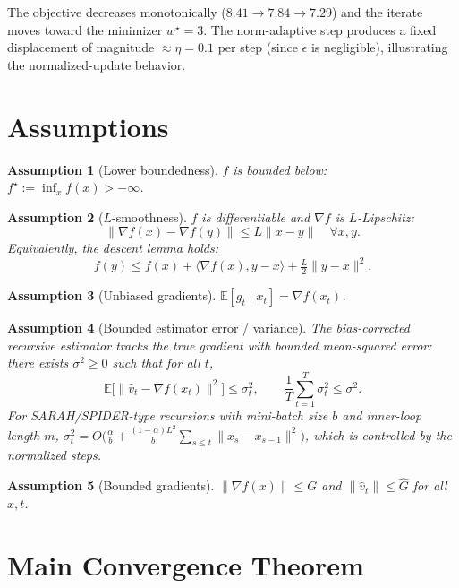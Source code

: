 \documentclass[11pt]{article}
\newtheorem{assumption}{Assumption}
\begin{document}
\noindent
The objective decreases monotonically ($8.41 \to 7.84 \to 7.29$) and the iterate moves
toward the minimizer $w^\star=3$. The norm-adaptive step produces a fixed displacement of
magnitude $\approx \eta = 0.1$ per step (since $\epsilon$ is negligible), illustrating the
normalized-update behavior.

\section*{Assumptions}

\begin{assumption}[Lower boundedness]\label{as:lb}
$f$ is bounded below: $f^\star := \inf_x f(x) > -\infty$.
\end{assumption}

\begin{assumption}[$L$-smoothness]\label{as:smooth}
$f$ is differentiable and $\nabla f$ is $L$-Lipschitz:
\[
\|\nabla f(x) - \nabla f(y)\| \le L\|x-y\| \quad \forall x,y.
\]
Equivalently, the descent lemma holds:
\[
f(y) \le f(x) + \langle \nabla f(x), y-x\rangle + \tfrac{L}{2}\|y-x\|^2.
\]
\end{assumption}

\begin{assumption}[Unbiased gradients]\label{as:unbiased}
$\mathbb{E}[g_t \mid x_t] = \nabla f(x_t)$.
\end{assumption}

\begin{assumption}[Bounded estimator error / variance]\label{as:var}
The bias-corrected recursive estimator tracks the true gradient with bounded
mean-squared error: there exists $\sigma^2 \ge 0$ such that for all $t$,
\[
\mathbb{E}\big[\|\hat v_t - \nabla f(x_t)\|^2\big] \le \sigma_t^2,
\qquad
\frac{1}{T}\sum_{t=1}^T \sigma_t^2 \le \sigma^2 .
\]
For SARAH/SPIDER-type recursions with mini-batch size $b$ and inner-loop length $m$,
$\sigma_t^2 = O\!\big(\tfrac{\alpha}{b} + \tfrac{(1-\alpha) L^2}{b}\sum_{s\le t}\|x_s-x_{s-1}\|^2\big)$,
which is controlled by the normalized steps.
\end{assumption}

\begin{assumption}[Bounded gradients]\label{as:bg}
$\|\nabla f(x)\| \le G$ and $\|\hat v_t\| \le \hat G$ for all $x,t$.
\end{assumption}

\section*{Main Convergence Theorem}
\end{document}
